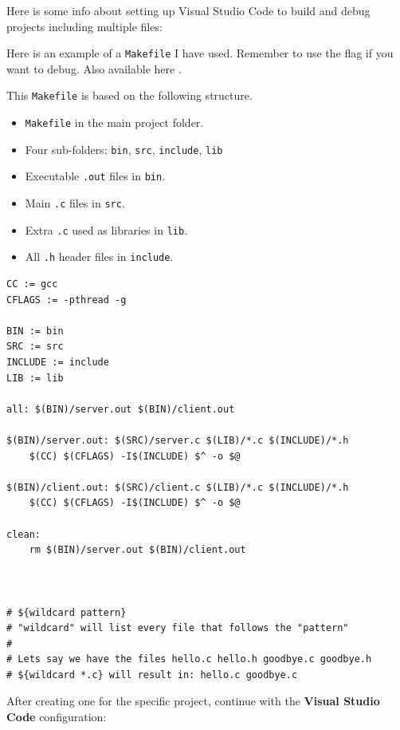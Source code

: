
Here is some info about setting up Visual Studio Code to build and debug projects including multiple files:


Here is an example of a \texttt{Makefile} I have used. Remember to use the  flag if you want to debug. Also available here .

This \texttt{Makefile} is based on the following structure.
\begin{itemize}
    \item \texttt{Makefile} in the main project folder.
    \item Four sub-folders: \texttt{bin}, \texttt{src}, \texttt{include}, \texttt{lib}
    \item Executable \texttt{.out} files in \texttt{bin}.
    \item Main \texttt{.c} files in \texttt{src}.
    \item Extra \texttt{.c} used as libraries in \texttt{lib}.
    \item All \texttt{.h} header files in \texttt{include}.
\end{itemize}

\begin{verbatim}
CC := gcc
CFLAGS := -pthread -g

BIN := bin
SRC := src
INCLUDE := include
LIB := lib

all: $(BIN)/server.out $(BIN)/client.out

$(BIN)/server.out: $(SRC)/server.c $(LIB)/*.c $(INCLUDE)/*.h
    $(CC) $(CFLAGS) -I$(INCLUDE) $^ -o $@

$(BIN)/client.out: $(SRC)/client.c $(LIB)/*.c $(INCLUDE)/*.h
    $(CC) $(CFLAGS) -I$(INCLUDE) $^ -o $@

clean:
    rm $(BIN)/server.out $(BIN)/client.out



# ${wildcard pattern}
# "wildcard" will list every file that follows the "pattern"
#
# Lets say we have the files hello.c hello.h goodbye.c goodbye.h
# ${wildcard *.c} will result in: hello.c goodbye.c
\end{verbatim}

After creating one for the specific project, continue with the \textbf{Visual Studio Code} configuration:

